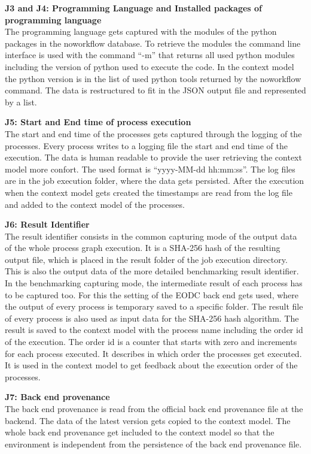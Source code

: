 \documentclass[draft,final]{vutinfth} %
\begin{document}
\textbf{J3 and J4: Programming Language and  Installed packages of programming language} \\
The programming language gets captured with the modules of the python packages in the noworkflow database. To retrieve the modules the command line interface is used with the command “-m” that returns all used python modules including the version of python used to execute the code. In the context model the python version is in the list of used python tools returned by the noworkflow command. The data is restructured to fit in the JSON output file and represented by a list. 

\textbf{J5: Start and End time of process execution} \\
The start and end time of the processes gets captured through the logging of the processes. Every process writes to a logging file the start and end time of the execution. The data is human readable to provide the user retrieving the context model more confort. The used format is “yyyy-MM-dd hh:mm:ss”. The log files are in the job execution folder, where the data gets persisted. After the execution when the context model gets created the timestamps are read from the log file and added to the context model of the processes.  

\textbf{J6: Result Identifier} \\
The result identifier consists in the common capturing mode of the output data of the whole process graph execution. It is a SHA-256 hash of the resulting output file, which is placed in the result folder of the job execution directory. This is also the output data of the more detailed benchmarking result identifier. In the benchmarking capturing mode, the intermediate result of each process has to be captured too. For this the setting of the EODC back end gets used, where the output of every process is temporary saved to a specific folder. The result file of every process is also used as input data for the SHA-256 hash algorithm. The result is saved to the context model with the process name including the order id of the execution. The order id is a counter that starts with zero and increments for each process executed. It describes in which order the processes get executed. It is used in the context model to get feedback about the execution order of the processes.

\textbf{J7: Back end provenance} \\
The back end provenance is read from the official back end provenance file at the backend. The data of the latest version gets copied to the context model. The whole back end provenance get included to the context model so that the environment is independent from the persistence of the back end provenance file. 
\end{document}
